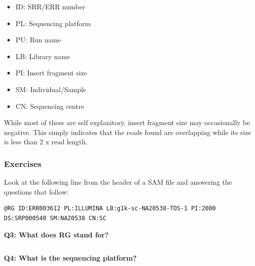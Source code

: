\documentclass[11pt]{article}
\makeatletter
\providecommand{\tightlist}{%
      \setlength{\itemsep}{0pt}\setlength{\parskip}{0pt}}
\newcommand{\boxspacing}{\kern\kvtcb@left@rule\kern\kvtcb@boxsep}
\newcommand{\prompt}[4]{
        {\ttfamily\llap{{\color{#2}[#3]:\hspace{3pt}#4}}\vspace{-\baselineskip}}
    }
\makeatother
\begin{document}
\begin{itemize}
\tightlist
\item
  ID: SRR/ERR number
\item
  PL: Sequencing platform
\item
  PU: Run name
\item
  LB: Library name
\item
  PI: Insert fragment size
\item
  SM: Individual/Sample
\item
  CN: Sequencing centre
\end{itemize}

While most of these are self explanitory, insert fragment size may
occasionally be negative. This simply indicates that the reads found are
overlapping while its size is less than 2 x read length.

    \hypertarget{exercises}{%
\subsubsection{Exercises}\label{exercises}}

Look at the following line from the header of a SAM file and answering
the questions that follow:

\begin{verbatim}
@RG ID:ERR003612 PL:ILLUMINA LB:g1k-sc-NA20538-TOS-1 PI:2000 DS:SRP000540 SM:NA20538 CN:SC
\end{verbatim}

\textbf{Q3: What does RG stand for?}

    \begin{tcolorbox}[breakable, size=fbox, boxrule=1pt, pad at break*=1mm,colback=cellbackground, colframe=cellborder]
\prompt{In}{incolor}{ }{\boxspacing}
\begin{Verbatim}[commandchars=\\\{\}]

\end{Verbatim}
\end{tcolorbox}

    \textbf{Q4: What is the sequencing platform?}

    \begin{tcolorbox}[breakable, size=fbox, boxrule=1pt, pad at break*=1mm,colback=cellbackground, colframe=cellborder]
\prompt{In}{incolor}{ }{\boxspacing}
\begin{Verbatim}[commandchars=\\\{\}]

\end{Verbatim}
\end{tcolorbox}
\end{document}
